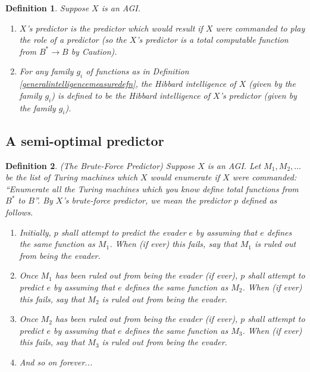 \documentclass{article}
\newtheorem{definition}{Definition}
\begin{document}
\begin{definition}
\label{Xspredictordefn}
    Suppose $X$ is an AGI.
    \begin{enumerate}
        \item
        \emph{$X$'s predictor} is the predictor which
        would result if $X$ were commanded to play the role of a predictor (so
        the $X$'s predictor is a total computable function from $B^*\to B$ by Caution).
        \item
        For any family $g_i$ of functions as in
        Definition \ref{generalintelligencemeasuredefn},
        the \emph{Hibbard intelligence of $X$ (given by the family $g_i$)}
        is defined to be the Hibbard intelligence of
        $X$'s predictor (given by the family $g_i$).
    \end{enumerate}
\end{definition}

\subsection{A semi-optimal predictor}
\label{semioptimalpredictorsubsection}

\begin{definition}
\label{bruteforcepredictordefn}
    (The Brute-Force Predictor)
    Suppose $X$ is an AGI. Let $M_1,M_2,\ldots$ be the list of Turing machines
    which $X$ would enumerate if $X$ were commanded: ``Enumerate all the Turing
    machines which you know define total functions from $B^*$ to $B$''.
    By \emph{$X$'s brute-force predictor}, we mean the predictor $p$ defined
    as follows.
    \begin{enumerate}
        \item
        Initially, $p$ shall attempt to predict the evader $e$ by assuming that $e$
        defines the same function as $M_1$. When (if ever) this fails,
        say that \emph{$M_1$ is ruled out from being the evader}.
        \item
        Once $M_1$ has been ruled out from being the evader (if ever),
        $p$ shall attempt to predict $e$ by assuming that $e$ defines the same
        function as $M_2$. When (if ever) this fails,
        say that \emph{$M_2$ is ruled out from being the evader}.
        \item
        Once $M_2$ has been ruled out from being the evader (if ever),
        $p$ shall attempt to predict $e$ by assuming that $e$ defines the same
        function as $M_3$. When (if ever) this fails,
        say that \emph{$M_3$ is ruled out from being the evader}.
        \item
        And so on forever...
    \end{enumerate}
\end{definition}
\end{document}
